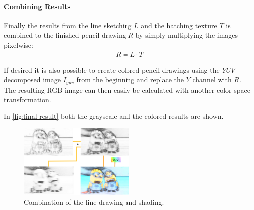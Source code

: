 \paragraph{Combining Results}
Finally the results from the line sketching $L$ and the hatching texture $T$ is
combined to the finished pencil drawing $R$ by simply multiplying the images
pixelwise:
\begin{align*}
  R = L  \cdot T
\end{align*}

If desired it is also possible to create colored pencil drawings using the $YUV$
decomposed image $I_{yuv}$ from the beginning and replace the $Y$ channel with
$R$. The resulting RGB-image can then easily be calculated with another color
space transformation.

In \autoref{fig:final-result} both the grayscale and the colored results are shown.

\begin{figure}[htb]
  \centering
  \includegraphics[width=0.5\textwidth]{images/final-result.png}
  \caption{Combination of the line drawing and shading.}
  \label{fig:final-result}
\end{figure}
